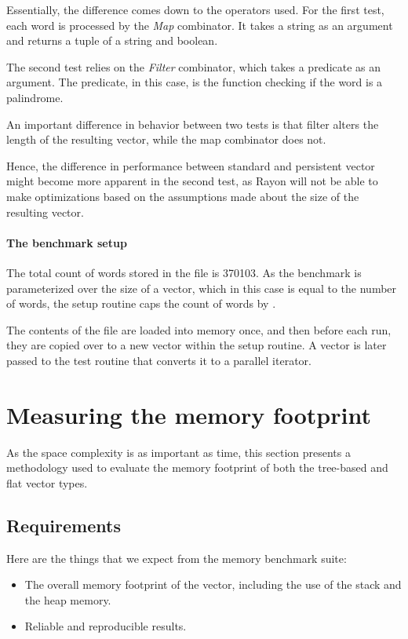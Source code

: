 Essentially, the difference comes down to the operators used. For the first test, each word is processed by the \emph{Map} combinator. It takes a string as an argument and returns a tuple of a string and boolean.

The second test relies on the \emph{Filter} combinator, which takes a predicate as an argument. The predicate, in this case, is the function checking if the word is a palindrome.

An important difference in behavior between two tests is that filter alters the length of the resulting vector, while the map combinator does not.

Hence, the difference in performance between standard and persistent vector might become more apparent in the second test, as Rayon will not be able to make optimizations based on the assumptions made about the size of the resulting vector.

\paragraph{The benchmark setup}
The total count of words stored in the file is 370103. As the benchmark is parameterized over the size of a vector, which in this case is equal to the number of words, the setup routine caps the count of words by \n{}.

The contents of the file are loaded into memory once, and then before each run, they are copied over to a new vector within the setup routine. A vector is later passed to the test routine that converts it to a parallel iterator.

\section{Measuring the memory footprint}
As the space complexity is as important as time, this section presents a methodology used to evaluate the memory footprint of both the tree-based and flat vector types.

\subsection{Requirements}

Here are the things that we expect from the memory benchmark suite:
\begin{itemize}
    \item The overall memory footprint of the vector, including the use of the stack and the heap memory.
    \item Reliable and reproducible results.
\end{itemize}

